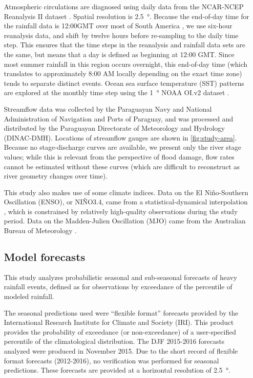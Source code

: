\documentclass{ametsoc}
\begin{document}
Atmospheric circulations are diagnosed using daily data from the NCAR-NCEP Reanalysis II dataset \citep{Kanamitsu:2002kk}.
Spatial resolution is \SI{2.5}{\degree}.
Because the end-of-day time for the rainfall data is 12:00GMT over most of South America \citep{xie2010cpc}, we use six-hour reanalysis data, and shift by twelve hours before re-sampling to the daily time step.
This ensures that the time steps in the reanalysis and rainfall data sets are the same, but means that a day is defined as beginning at 12:00 GMT.
Since most summer rainfall in this region occurs overnight, this end-of-day time (which translates to approximately 8:00 AM locally depending on the exact time zone) tends to separate distinct events.
Ocean sea surface temperature (SST) patterns are explored at the monthly time step using the \SI{1}{\degree} NOAA OI.v2 dataset \citep{Reynolds:2002iy}.

Streamflow data was collected by the Paraguayan Navy and National Administration of Navigation and Ports of Paraguay, and was processed and distributed by the Paraguayan Directorate of Meteorology and Hydrology (DINAC-DMH).
Locations of streamflow gauges are shown in \cref{fig:study-area}.
Because no stage-discharge curves are available, we present only the river stage values; while this is relevant from the perspective of flood damage, flow rates cannot be estimated without these curves (which are difficult to reconstruct as river geometry changes over time).

This study also makes use of some climate indices.
Data on the El Ni\~{n}o-Southern Oscillation (ENSO), or NI\~NO3.4, came from a statistical-dynamical interpolation \citep{Kaplan:1998df}, which is constrained by relatively high-quality observations during the study period.
Data on the Madden-Julien Oscillation (MJO) came from the Australian Bureau of Meteorology \citep{Wheeler:2004ea}.

\subsection{Model forecasts}

This study analyzes probabilistic seasonal and sub-seasonal forecasts of heavy rainfall events, defined as for observations by exceedance of the  percentile of modeled rainfall.

The seasonal predictions used were ``flexible format'' forecasts provided by the International Research Institute for Climate and Society (IRI).
This product provides the probability of exceedance (or non-exceedance) of a user-specified percentile of the climatological distribution.
The DJF 2015-2016 forecasts analyzed were produced in November 2015.
Due to the short record of flexible format forecasts (2012-2016), no verification was performed for seasonal predictions.
These forecasts are provided at a horizontal resolution of \SI{2.5}{\degree}.
\end{document}
